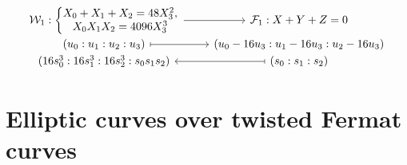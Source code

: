 \documentclass{amsart}
\newcommand{\cF}{\mathcal{F}}
\newcommand{\cW}{\mathcal{W}}
\begin{document}
$$
\begin{tikzcd}[row sep=-2mm,column sep=8mm]
  \cW_1: \left\{
  \begin{array}{@{}c@{}}
    X_0 + X_1 + X_2 = 48 X_3^2,\\
    X_0 X_1 X_2 = 4096 X_3^3
  \end{array} \right. \arrow[r] & \cF_1 : X + Y + Z = 0\\[1mm]
  (u_0:u_1:u_2:u_3) \arrow[r,mapsto] & (u_0-16u_3 : u_1-16u_3 : u_2-16u_3)\\[1mm]
  (16s_0^3:16s_1^3:16s_2^3:s_0s_1s_2) & \arrow[l,mapsto] (s_0:s_1:s_2)
\end{tikzcd}
$$

\section*{Elliptic curves over twisted Fermat curves}
\end{document}
